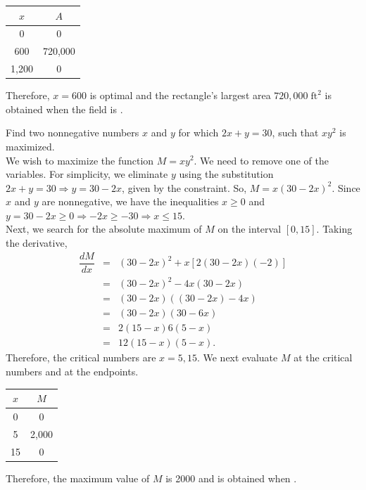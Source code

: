 \documentclass{book}
\begin{document}
\begin{Exam}
\begin{center}
\begin{tabular}{c|c}
$x$ & $A$ \\ \hline
0 & 0 \\ 
600 & 720,000 \\ 
1,200 & 0 \\ 
\end{tabular}
\end{center}
Therefore, $x=600$ is optimal and the rectangle's largest area $720,000\; \text{ft}^2$ is obtained when the field is . 
\end{Exam}\vs

\begin{Exam} Find two nonnegative numbers $x$ and $y$ for which $2x+y=30$, such that $xy^2$ is maximized.\\

We wish to maximize the function $M = xy^2$. We need to remove one of the variables. For simplicity, we eliminate $y$ using the substitution $2x+y = 30 \Rightarrow y = 30-2x$, given by the constraint. So, $M = x(30-2x)^2$. Since $x$ and $y$ are nonnegative, we have the inequalities $x\ge 0$ and $y = 30-2x \ge 0 \Rightarrow -2x \ge -30 \Rightarrow x \le 15$.\\

Next, we search for the absolute maximum of $M$ on the interval $[0,15]$. Taking the derivative,
\begin{eqnarray*}
\dfrac{dM}{dx} &=& (30-2x)^2+x[2(30-2x)(-2)]\\
&=& (30-2x)^2 - 4x(30-2x)\\
&=& (30-2x)((30-2x) - 4x)\\
&=& (30-2x)(30-6x)\\
&=& 2(15-x)6(5-x)\\
&=& 12(15-x)(5-x).
\end{eqnarray*}
Therefore, the critical numbers are $x= 5, 15$. We next evaluate $M$ at the critical numbers and at the endpoints.
\begin{center}
\begin{tabular}{c|c}

$x$ & $M$ \\ \hline
0 & 0 \\ 
5 & 2,000 \\ 
15 & 0 \\ 
\end{tabular}
\end{center}
Therefore, the maximum value of $M$ is 2000 and is obtained when . 
\end{Exam}\vs
\end{document}
